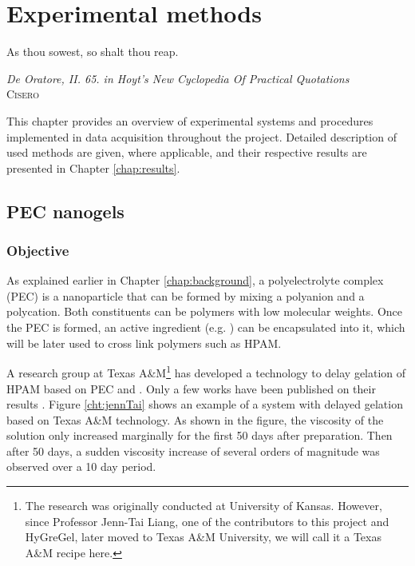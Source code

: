 \chapter{Experimental methods} \label{chap:experimental}
\vspace*{\fill}
\epigraph{As thou sowest, so shalt thou reap.}%
{\textit{De Oratore, II. 65. in Hoyt's New Cyclopedia Of Practical Quotations}\\ \textsc{Cisero}}
\clearpage{\thispagestyle{empty}\cleardoublepage}
This chapter provides an overview of experimental systems and procedures implemented in data acquisition throughout the project. Detailed description of used methods are given, where applicable, and their respective results are presented in Chapter \ref{chap:results}.

\section{PEC nanogels} 
\subsection{Objective}
As explained earlier in Chapter \ref{chap:background}, a polyelectrolyte complex  (PEC) is a nanoparticle that can be formed by mixing a polyanion and a polycation. Both constituents can be polymers with low molecular weights. Once the PEC is formed, an active ingredient (e.g. ) can be encapsulated into it, which will be later used to cross link polymers such as HPAM.

A research group at Texas A\&M\footnote{The research was originally conducted at University of Kansas. However, since Professor Jenn-Tai Liang, one of the contributors to this project and HyGreGel, later moved to Texas A\&M University, we will call it a Texas A\&M recipe here.} has developed a technology to delay gelation of HPAM based on PEC and . Only a few works have been published on their results \citep[e.g.][]{Cordova2008,Johnson2010}. Figure \ref{cht:jennTai} shows an example of a system with delayed gelation based on Texas A\&M technology. As shown in the figure, the viscosity of the solution only increased marginally for the first 50 days after preparation. Then after 50 days, a sudden viscosity increase of several orders of magnitude was observed over a 10 day period.

